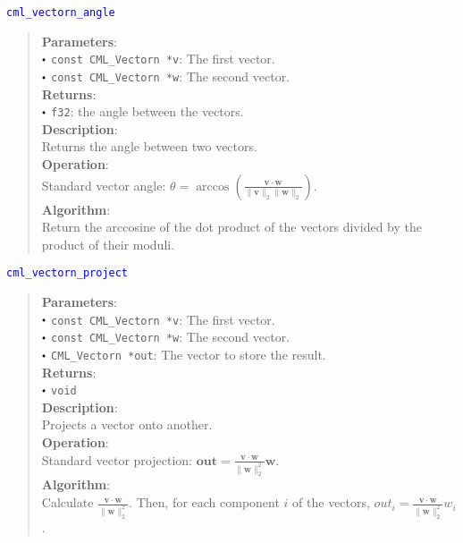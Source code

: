 \documentclass[a4paper,oneside,8pt]{extarticle}
\newcommand{\function}[1]{
  \noindent\textcolor{blue}{\texttt{#1}}
  \vspace{-0.3em}
}
\renewcommand{\dot}{\raisebox{0.3ex}{\scalebox{0.6}{$\bullet$}}}
\theoremstyle{definition}
\begin{document}
\function{cml\_vectorn\_angle}
\begin{quote}
  \textbf{Parameters}: \\
  $\dot$ \texttt{const CML\_Vectorn *v}: The first vector. \\
  $\dot$ \texttt{const CML\_Vectorn *w}: The second vector. \\
  \textbf{Returns}: \\
  $\dot$ \texttt{f32}: the angle between the vectors. \\

  \vspace{-0.75em}
  \textbf{Description}: \\
  Returns the angle between two vectors. \\

  \vspace{-0.75em}
  \textbf{Operation}: \\
  Standard vector angle: $\theta = \arccos\left(\frac{\mathbf{v} \cdot \mathbf{w}}{\lVert\mathbf{v}\rVert_2\lVert\mathbf{w}\rVert_2}\right)$. \\

  \vspace{-0.75em}
  \textbf{Algorithm}: \\
  Return the arccosine of the dot product of the vectors divided by the product of their moduli. \\
\end{quote}

\function{cml\_vectorn\_project}
\begin{quote}
  \textbf{Parameters}: \\
  $\dot$ \texttt{const CML\_Vectorn *v}: The first vector. \\
  $\dot$ \texttt{const CML\_Vectorn *w}: The second vector. \\
  $\dot$ \texttt{CML\_Vectorn *out}: The vector to store the result. \\
  \textbf{Returns}: \\
  $\dot$ \texttt{void} \\

  \vspace{-0.75em}
  \textbf{Description}: \\
  Projects a vector onto another. \\

  \vspace{-0.75em}
  \textbf{Operation}: \\
  Standard vector projection: $\mathbf{out} = \frac{\mathbf{v} \cdot \mathbf{w}}{\lVert\mathbf{w}\rVert_2^2}\mathbf{w}$. \\

  \vspace{-0.75em}
  \textbf{Algorithm}: \\
  Calculate $\frac{\mathbf{v} \cdot \mathbf{w}}{\lVert \mathbf{w}\rVert_2^2}$. Then, for each component $i$ of the vectors, $out_i = \frac{\mathbf{v} \cdot \mathbf{w}}{\lVert \mathbf{w}\rVert_2^2}w_i$.
\end{quote}
\end{document}
